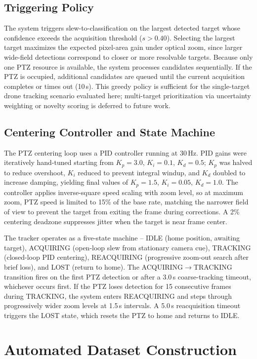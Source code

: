 \documentclass[conf]{new-aiaa}
\begin{document}
\subsection{Triggering Policy}
The system triggers slew-to-classification on the largest detected target whose confidence exceeds the acquisition threshold ($s > 0.40$). Selecting the largest target maximizes the expected pixel-area gain under optical zoom, since larger wide-field detections correspond to closer or more resolvable targets. Because only one PTZ resource is available, the system processes candidates sequentially. If the PTZ is occupied, additional candidates are queued until the current acquisition completes or times out (10\,s). This greedy policy is sufficient for the single-target drone tracking scenario evaluated here; multi-target prioritization via uncertainty weighting or novelty scoring is deferred to future work.

\subsection{Centering Controller and State Machine}
The PTZ centering loop uses a PID controller running at 30\,Hz. PID gains were iteratively hand-tuned starting from $K_p{=}3.0$, $K_i{=}0.1$, $K_d{=}0.5$; $K_p$ was halved to reduce overshoot, $K_i$ reduced to prevent integral windup, and $K_d$ doubled to increase damping, yielding final values of $K_p{=}1.5$, $K_i{=}0.05$, $K_d{=}1.0$. The controller applies inverse-square speed scaling with zoom level, so at maximum zoom, PTZ speed is limited to 15\% of the base rate, matching the narrower field of view to prevent the target from exiting the frame during corrections. A 2\% centering deadzone suppresses jitter when the target is near frame center.
\par
The tracker operates as a five-state machine -- IDLE (home position, awaiting target), ACQUIRING (open-loop slew from stationary camera cue), TRACKING (closed-loop PID centering), REACQUIRING (progressive zoom-out search after brief loss), and LOST (return to home). The ACQUIRING$\to$TRACKING transition fires on the first PTZ detection or after a 3.0\,s coarse-tracking timeout, whichever occurs first. If the PTZ loses detection for 15 consecutive frames during TRACKING, the system enters REACQUIRING and steps through progressively wider zoom levels at 1.5\,s intervals. A 5.0\,s reacquisition timeout triggers the LOST state, which resets the PTZ to home and returns to IDLE.

\section{Automated Dataset Construction}
\end{document}
